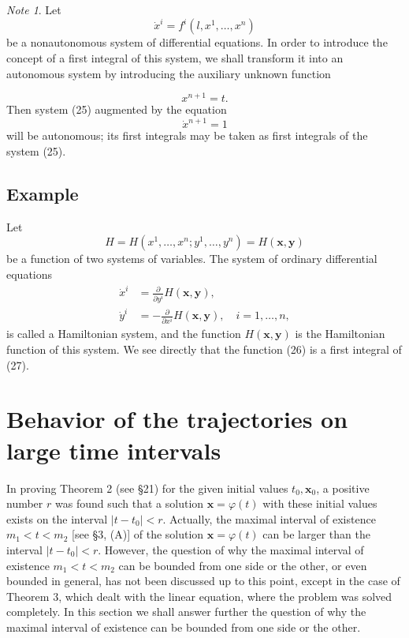 \documentclass[10pt,a5paper]{book}
\theoremstyle{plain}
\theoremstyle{definition}
\theoremstyle{remark}
\newtheorem*{note}{Note}
\begin{document}
\begin{note}
Let
\begin{equation*}
\dot{x}^{i}=f^{i}\left(l, x^{1}, \ldots, x^{n}\right) \tag{25}
\end{equation*}
be a nonautonomous system of differential equations. In order to introduce the concept of a first integral of this system, we shall transform it into an autonomous system by introducing the auxiliary unknown function
\end{note}

\[
x^{n+1}=t .
\]
Then system (25) augmented by the equation
\[
\dot{x}^{n+1}=1
\]
will be autonomous; its first integrals may be taken as first integrals of the system (25).

\subsection*{Example}
Let
\begin{equation*}
H=H\left(x^{1}, \ldots, x^{n} ; y^{1}, \ldots, y^{n}\right)=H(\mathbf{x}, \mathbf{y}) \tag{26}
\end{equation*}
be a function of two systems of variables. The system of ordinary differential equations
\begin{align*}
\dot{x}^{i} & =\frac{\partial}{\partial y^{i}} H(\mathbf{x}, \mathbf{y}),  \tag{27}\\
\dot{y}^{i} & =-\frac{\partial}{\partial x^{i}} H(\mathbf{x}, \mathbf{y}), \quad i=1, \ldots, n,
\end{align*}
is called a Hamiltonian system, and the function $H(\mathbf{x}, \mathbf{y})$ is the Hamiltonian function of this system. We see directly that the function (26) is a first integral of (27).

\section{Behavior of the trajectories on large time intervals}
In proving Theorem 2 (see §21) for the given initial values $t_{0}, \mathbf{x}_{0}$, a positive number $r$ was found such that a solution $\mathbf{x}=\varphi(t)$ with these initial values exists on the interval $\left|t-t_{0}\right|<r$. Actually, the maximal interval of existence $m_{1}<t<m_{2}$ [see §3, (A)] of the solution $\mathbf{x}=\varphi(t)$ can be larger than the interval $\left|t-t_{0}\right|<r$. However, the question of why the maximal interval of existence $m_{1}<t<m_{2}$ can be bounded from one side or the other, or even bounded in general, has not been discussed up to this point, except in the case of Theorem 3, which dealt with the linear equation, where the problem was solved completely. In this section we shall answer further the question of why the maximal interval of existence can be bounded from one side or the other.
\end{document}
